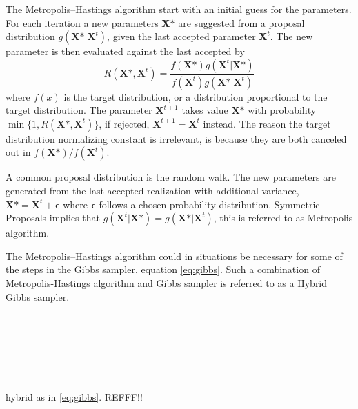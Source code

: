 The Metropolis–Hastings algorithm start with an initial guess for the parameters. For each iteration a new parameters $\boldsymbol{X} \mbox{*}$ are suggested from a proposal distribution $g(\boldsymbol{X} \mbox{*}|\boldsymbol{X}^t)$, given the last accepted parameter $\boldsymbol{X}^t$. The new parameter is then evaluated against the last accepted by
\begin{equation}
\label{eq:MHratio}
R(\boldsymbol{X} \mbox{*},\boldsymbol{X}^{t})=\frac{f(\boldsymbol{X} \mbox{*})g(\boldsymbol{X}^{t}|\boldsymbol{X} \mbox{*})}{f(\boldsymbol{X}^{t})g(\boldsymbol{X} \mbox{*}|\boldsymbol{X}^{t})}
\end{equation}
where $f(x)$ is the target distribution, or a distribution proportional to the target distribution. The parameter $\boldsymbol{X}^{t+1}$ takes value $\boldsymbol{X}\mbox{*}$ with probability $\min\{1,R(\boldsymbol{X} \mbox{*},\boldsymbol{X}^{t})\}$, if rejected, $\boldsymbol{X}^{t+1}=\boldsymbol{X}^t$ instead. The reason the target distribution normalizing constant is irrelevant, is because they are both canceled out in $f(\boldsymbol{X} \mbox{*})/f(\boldsymbol{X}^{t})$.

A common proposal distribution is the random walk. The new parameters are generated from the last accepted realization with additional variance, $\boldsymbol{X}\mbox{*}= \boldsymbol{X}^{t} + \boldsymbol{\epsilon}$ where $\boldsymbol{\epsilon}$ follows a chosen probability distribution. Symmetric Proposals implies that $ g(\boldsymbol{X}^{t}|\boldsymbol{X} \mbox{*}) = g(\boldsymbol{X} \mbox{*}|\boldsymbol{X}^{t})$, this is referred to as Metropolis algorithm.

The Metropolis–Hastings algorithm could in situations be necessary for some of the steps in the Gibbs sampler, equation \eqref{eq:gibbs}. Such a combination of Metropolis-Hastings algorithm and Gibbs sampler is referred to as a Hybrid Gibbs sampler.  


\cite[p.~202]{compstat}\\ %
\cite[p.~216]{compstat}\\ %
\cite[p.~191]{MCMC}\\ %
\cite[p.~205]{MCMC}\\ %
\cite{MH}\\ %
\cite{HG} %

%
%
hybrid as in \eqref{eq:gibbs}.
REFFF!!\\

